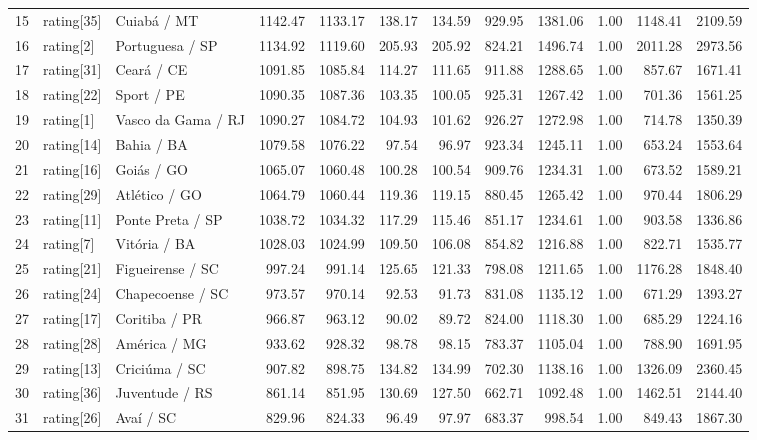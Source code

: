 \begin{table}[ht]
\begin{tabular}{rllrrrrrrrrr}
  15 & rating[35] & Cuiabá / MT & 1142.47 & 1133.17 & 138.17 & 134.59 & 929.95 & 1381.06 & 1.00 & 1148.41 & 2109.59 \\ 
  16 & rating[2] & Portuguesa / SP & 1134.92 & 1119.60 & 205.93 & 205.92 & 824.21 & 1496.74 & 1.00 & 2011.28 & 2973.56 \\ 
  17 & rating[31] & Ceará / CE & 1091.85 & 1085.84 & 114.27 & 111.65 & 911.88 & 1288.65 & 1.00 & 857.67 & 1671.41 \\ 
  18 & rating[22] & Sport / PE & 1090.35 & 1087.36 & 103.35 & 100.05 & 925.31 & 1267.42 & 1.00 & 701.36 & 1561.25 \\ 
  19 & rating[1] & Vasco da Gama / RJ & 1090.27 & 1084.72 & 104.93 & 101.62 & 926.27 & 1272.98 & 1.00 & 714.78 & 1350.39 \\ 
  20 & rating[14] & Bahia / BA & 1079.58 & 1076.22 & 97.54 & 96.97 & 923.34 & 1245.11 & 1.00 & 653.24 & 1553.64 \\ 
  21 & rating[16] & Goiás / GO & 1065.07 & 1060.48 & 100.28 & 100.54 & 909.76 & 1234.31 & 1.00 & 673.52 & 1589.21 \\ 
  22 & rating[29] & Atlético / GO & 1064.79 & 1060.44 & 119.36 & 119.15 & 880.45 & 1265.42 & 1.00 & 970.44 & 1806.29 \\ 
  23 & rating[11] & Ponte Preta / SP & 1038.72 & 1034.32 & 117.29 & 115.46 & 851.17 & 1234.61 & 1.00 & 903.58 & 1336.86 \\ 
  24 & rating[7] & Vitória / BA & 1028.03 & 1024.99 & 109.50 & 106.08 & 854.82 & 1216.88 & 1.00 & 822.71 & 1535.77 \\ 
  25 & rating[21] & Figueirense / SC & 997.24 & 991.14 & 125.65 & 121.33 & 798.08 & 1211.65 & 1.00 & 1176.28 & 1848.40 \\ 
  26 & rating[24] & Chapecoense / SC & 973.57 & 970.14 & 92.53 & 91.73 & 831.08 & 1135.12 & 1.00 & 671.29 & 1393.27 \\ 
  27 & rating[17] & Coritiba / PR & 966.87 & 963.12 & 90.02 & 89.72 & 824.00 & 1118.30 & 1.00 & 685.29 & 1224.16 \\ 
  28 & rating[28] & América / MG & 933.62 & 928.32 & 98.78 & 98.15 & 783.37 & 1105.04 & 1.00 & 788.90 & 1691.95 \\ 
  29 & rating[13] & Criciúma / SC & 907.82 & 898.75 & 134.82 & 134.99 & 702.30 & 1138.16 & 1.00 & 1326.09 & 2360.45 \\ 
  30 & rating[36] & Juventude / RS & 861.14 & 851.95 & 130.69 & 127.50 & 662.71 & 1092.48 & 1.00 & 1462.51 & 2144.40 \\ 
  31 & rating[26] & Avaí / SC & 829.96 & 824.33 & 96.49 & 97.97 & 683.37 & 998.54 & 1.00 & 849.43 & 1867.30 \\ 

\end{tabular}
\end{table}
